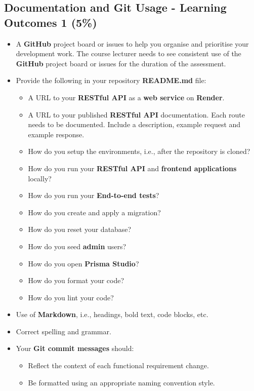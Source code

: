 \documentclass{article}
\begin{document}
\subsection*{Documentation and Git Usage - Learning Outcomes 1 (5\%)}
\begin{itemize}
	\item A \textbf{GitHub} project board or issues to help you organise and prioritise your development work. The course lecturer needs to see consistent use of the \textbf{GitHub} project board or issues for the duration of the assessment.
	\item Provide the following in your repository \textbf{README.md} file:
	\begin{itemize}
		\item A URL to your \textbf{RESTful API} as a \textbf{web service} on \textbf{Render}.
		\item A URL to your published \textbf{RESTful API} documentation. Each route needs to be documented. Include a description, example request and example response.
		\item How do you setup the environments, i.e., after the repository is cloned?
		\item How do you run your \textbf{RESTful API} and \textbf{frontend applications} locally?
		\item How do you run your \textbf{End-to-end tests}?
		\item How do you create and apply a migration?  
		\item How do you reset your database?
		\item How do you seed \textbf{admin} users?
		\item How do you open \textbf{Prisma Studio}?
		\item How do you format your code?
		\item How do you lint your code?	 	
	\end{itemize}
    \item Use of \textbf{Markdown}, i.e., headings, bold text, code blocks, etc.
    \item Correct spelling and grammar.
    \item Your \textbf{Git commit messages} should:
    \begin{itemize}
      \item Reflect the context of each functional requirement change.
      \item Be formatted using an appropriate naming convention style.
    \end{itemize}
\end{itemize}
\end{document}
